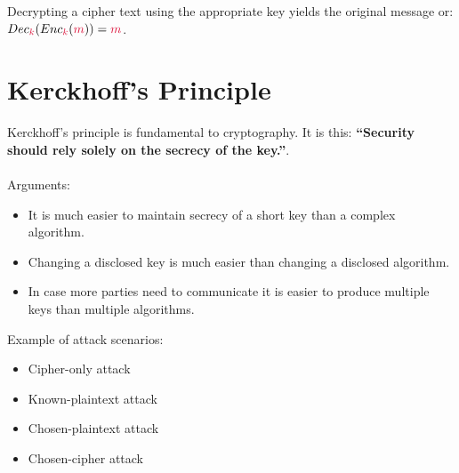     Decrypting a cipher text using the appropriate key yields the original message or: $Dec_\ck(Enc_\ck(\cm))=\cm$.
    \\
    
\section{Kerckhoff's Principle}
    Kerckhoff's principle is fundamental to cryptography. It is this: \textbf{``Security should rely solely on the secrecy of the key.''}.\\
    \\
    Arguments:
    \begin{itemize}
      \item It is much easier to maintain secrecy of a short key than a complex algorithm.
      \item Changing a disclosed key is much easier than changing a disclosed algorithm.
      \item In case more parties need to communicate it is easier to produce multiple keys than multiple algorithms.
    \end{itemize}
    Example of attack scenarios:
    \begin{itemize}
      \item Cipher-only attack
      \item Known-plaintext attack
      \item Chosen-plaintext attack
      \item Chosen-cipher attack
    \end{itemize}


